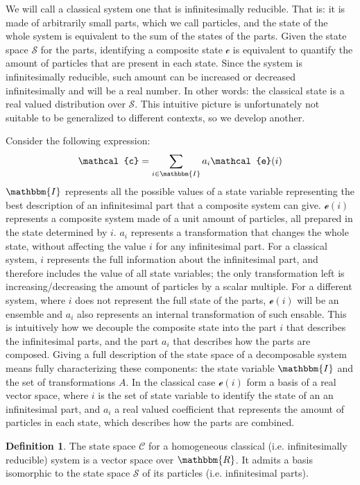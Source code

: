 \documentclass[aps,pra,10pt,twocolumn,floatfix,nofootinbib]{revtex4-1}
\theoremstyle{definition}
\newtheorem{defn}[prop]{Definition}
\begin{document}
We will call a classical system one that is infinitesimally reducible. That is: it is made of arbitrarily small parts, which we call particles, and the state of the whole system is equivalent to the sum of the states of the parts. Given the state space $\mathcal{S}$ for the parts, identifying a composite state $\mathcal{c}$ is equivalent to quantify the amount of particles that are present in each state. Since the system is infinitesimally reducible, such amount can be increased or decreased infinitesimally and will be a real number. In other words: the classical state is a real valued distribution over $\mathcal{S}$. This intuitive picture is unfortunately not suitable to be generalized to different contexts, so we develop another.

Consider the following expression:
\begin{align*}
\mathcal{c} = \sum\limits_{i \in \mathbbm{I}} a_i \mathcal{e}(i)
\end{align*}
$\mathbbm{I}$ represents all the possible values of a state variable representing the best description of an infinitesimal part that a composite system can give. $\mathcal{e}(i)$ represents a composite system made of a unit amount of particles, all prepared in the state determined by $i$. $a_i$ represents a transformation that changes the whole state, without affecting the value $i$ for any infinitesimal part. For a classical system, $i$ represents the full information about the infinitesimal part, and therefore includes the value of all state variables; the only transformation left is increasing/decreasing the amount of particles by a scalar multiple. For a different system, where $i$ does not represent the full state of the parts, $\mathcal{e}(i)$ will be an ensemble and $a_i$ also represents an internal transformation of such ensable. This is intuitively how we decouple the composite state into the part $i$ that describes the infinitesimal parts, and the part $a_i$ that describes how the parts are composed. Giving a full description of the state space of a decomposable system means fully characterizing these components: the state variable $\mathbbm{I}$ and the set of transformations $A$. In the classical case $\mathcal{e}(i)$ form a basis of a real vector space, where $i$ is the set of state variable to identify the state of an an infinitesimal part, and $a_i$ a real valued coefficient that represents the amount of particles in each state, which describes how the parts are combined.

\begin{defn}\label{classical_vector space}
The state space $\mathcal{C}$ for a homogeneous classical (i.e. infinitesimally reducible) system is a vector space over $\mathbbm{R}$. It admits a basis isomorphic to the state space $\mathcal{S}$ of its particles (i.e. infinitesimal parts).
\end{defn}
\end{document}
